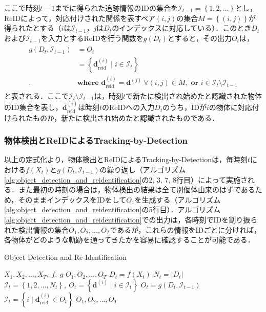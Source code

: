     ここで時刻$t-1$までに得られた追跡情報のIDの集合を$\mathcal{I}_{t-1} = \left\{1, 2, \dots\right\}$とし，ReIDによって，対応付けされた関係を表すペア$(i, j)$の集合$M = \left\{(i, j)\right\}$が得られたとする（$i$は$\mathcal{I}_{t-1}$，$j$は$D_t$のインデックスに対応している）．このとき$D_t$および$\mathcal{I}_{t-1}$を入力とするReIDを行う関数を$g(D_t)$とすると，その出力$O_t$は，
    \begin{eqnarray}
        \label{eq:output_of_reid}
        \begin{aligned}
            g(D_t, \mathcal{I}_{t-1}) &= O_t
            \\ &= \left\{\bm{d}_{\text{reid}}^{(i)} \mid i \in \mathcal{I}_t\right\}
            \\, &\textbf{where } \bm{d}_{\text{reid}}^{(i)} = \bm{d}^{(j)} ~ \forall (i, j) \in M, \textbf{ or } i \in \mathcal{I}_t \setminus \mathcal{I}_{t-1}
        \end{aligned}
    \end{eqnarray}
    と表される．ここで$\mathcal{I}_t \setminus \mathcal{I}_{t-1}$は，時刻$t$で新たに検出され始めたと認識された物体のID集合を表し，$\bm{d}_{\text{reid}}^{(i)}$は時刻$t$のReIDへの入力$D_t$のうち，IDが$i$の物体に対応付けられたものか，新たに検出され始めたと認識されたものである．

    \subsubsection{物体検出とReIDによるTracking-by-Detection}
    以上の定式化より，物体検出とReIDによるTracking-by-Detectionは，毎時刻$t$における$f(X_t)$と$g(D_t, \mathcal{I}_{t-1})$の繰り返し（アルゴリズム\ref{alg:object_detection_and_reidentification}の2, 3, 7, 8行目）によって実施される．また最初の時刻の場合は，物体検出の結果は全て別個体由来のはずであるため，そのままインデックスをIDをして$O_1$を生成する（アルゴリズム\ref{alg:object_detection_and_reidentification}の5行目）．アルゴリズム\ref{alg:object_detection_and_reidentification}での出力は，各時刻でIDを割り振られた検出情報の集合$O_1, O_2, \dots, O_T$であるが，これらの情報をIDごとに分ければ，各物体がどのような軌跡を通ってきたかを容易に確認することが可能である．

    \begin{algorithm}[t]
        \caption{Object Detection and Re-Identification}
        \label{alg:object_detection_and_reidentification}
        \begin{algorithmic}[1]
            \Require $X_1, X_2, \dots, X_T, ~f, ~g$
            \Ensure $O_1, O_2, \dots, O_T$
                \State $D_t = f(X_t)$
                \State $ N_t = \left|D_t\right|$
                    \State $\mathcal{I}_t = \left\{1, 2, \dots, N_t\right\}, ~ O_t = \left\{\bm{d}^{(i)} \mid i \in \mathcal{I}_t\right\}$
                \Else
                    \State $O_t = g(D_t, \mathcal{I}_{t-1})$
                    \State $\mathcal{I}_t = \left\{i \mid \bm{d}_{\text{reid}}^{(i)} \in O_t\right\}$
                \EndIf
            \EndFor
            \State \Return $O_1, O_2, \dots, O_T$
        \end{algorithmic}
    \end{algorithm}

